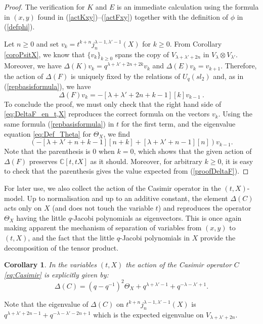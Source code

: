 \documentclass[a4paper,12pt]{article}
\numberwithin{equation}{section}
\newcommand{\C}{\mathbb{C}}
\newtheorem{coro}[theo]{Corollary}
\theoremstyle{rem}
\theoremstyle{definition}
\begin{document}
\begin{proof}
The verification for $K$ and $E$ is an immediate calculation using the formula in $(x,y)$ found in (\ref{actKxy})--(\ref{actFxy}) together with the definition of $\phi$ in (\ref{defphi}). 


Let $n\geq 0$ and set $v_k=t^{k+n}j^{\lambda-1,\lambda'-1}_n(X)$ for $k\geq 0$. From Corollary \ref{coroPsitX}, we know that $\{v_k\}_{k\geq 0}$ spans the copy of $V_{\lambda+\lambda'+2n}$ in $V_{\lambda}\otimes V_{\lambda'}$. Moreover, we have $\Delta(K)v_k=q^{\lambda+\lambda'+2n+2k}v_k$ and $\Delta(E)v_k=v_{k+1}$. Therefore, the action of $\Delta(F)$ is uniquely fixed by the relations of $U_q(sl_2)$ and, as in (\ref{repbasisformula}), we have
\begin{equation}\label{proofDeltaF}\Delta(F)v_k=-[\lambda+\lambda'+2n+k-1][k]v_{k-1}\ .\end{equation}
To conclude the proof, we must only check that the right hand side of \eqref{eq:DeltaF_en_t,X} reproduces the correct formula on the vectors $v_k$. Using the same formula (\ref{repbasisformula}) in $t$ for the first term, and the eigenvalue equation \eqref{eq:Def_Theta} for $\Theta_X$, we find
\begin{equation}
(-[\lambda+\lambda'+n+k-1][n+k]+[\lambda+\lambda'+n-1][n])v_{k-1}. 
\end{equation}
Note that the parenthesis is $0$ when $k=0$, which shows that the given action of $\Delta(F)$ preserves $\C[t,tX]$ as it should. Moreover, for arbitrary $k\geq0$, it is easy to check that the parenthesis gives the value expected from (\ref{proofDeltaF}).
\end{proof}

For later use, we also collect the action of the Casimir operator in the $(t,X)$-model. Up to normalisation and up to an additive constant, the element $\Delta(C)$ acts only on $X$ (and does not touch the variable $t$) and reproduces the operator $\Theta_X$ having the little $q$-Jacobi polynomials as eigenvectors. This is once again making apparent the mechanism of separation of variables from $(x,y)$ to $(t,X)$, and the fact that the little $q$-Jacobi polynomials in $X$ provide the decomposition of the tensor product.
\begin{coro}\label{coro_actiondeltaC}
In the variables $(t,X)$ the action of the Casimir operator $C$ \eqref{eq:Casimir} is explicitly given by:
\begin{equation}
\Delta(C) =(q-q^{-1})^2\Theta_X +q^{\lambda+\lambda'-1}+q^{-\lambda-\lambda'+1}.
\end{equation} 
\end{coro}
Note that the eigenvalue of $\Delta(C)$ on $t^{k+n}j^{\lambda-1,\lambda'-1}_n(X)$ is $q^{\lambda+\lambda'+2n-1}+q^{-\lambda-\lambda'-2n+1}$ which is the expected eigenvalue on $V_{\lambda+\lambda'+2n}$.
\end{document}
